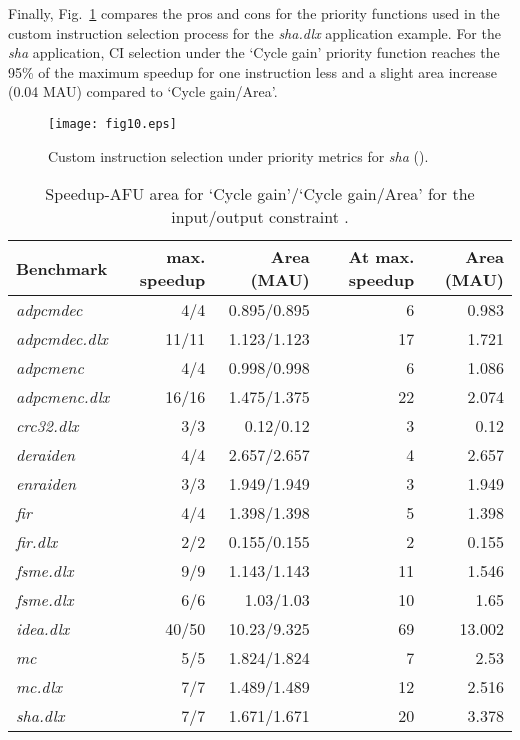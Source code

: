 \documentclass{comjnl}
\begin{document}
Finally, Fig.~\ref{Fig:10} compares the pros and cons for the priority functions 
used in the custom instruction selection process for the {\it sha.dlx} application example. For the {\it sha} application, CI selection under the `Cycle gain' priority function reaches the 95\% of the maximum speedup for one instruction less and a slight area increase (0.04 MAU) compared to `Cycle gain/Area'.

\begin{figure}[tb]
  \centering
  \texttt{[image: fig10.eps]}
  \caption{Custom instruction selection under priority metrics for {\it sha}
  ().}
  \label{Fig:10}
  \vspace{-0.175cm}
\end{figure}

\begin{table}
  \renewcommand{\arraystretch}{1.0}
  \caption{Speedup-AFU area for `Cycle gain'/`Cycle gain/Area' 
  for the input/output constraint .} 
  \centering
  {\footnotesize
  \begin{tabular}{|l|r|r|r|r|}
    \hline
    \multicolumn{1}{|m{1.2cm}|}{\centering Benchmark}
    &\multicolumn{1}{m{1.0cm}|}{\centering 0.95 max. speedup}
    &\multicolumn{1}{m{1.2cm}|}{\centering Area (MAU)}
    &\multicolumn{1}{m{1.0cm}|}{\centering At max. speedup}
    &\multicolumn{1}{m{1.2cm}|}{\centering Area (MAU)}\\
    \hline
{\it adpcmdec} & 4/4 & 0.895/0.895 & 6 & 0.983 \\ 
    \hline
{\it adpcmdec.dlx} & 11/11 & 1.123/1.123 & 17 & 1.721 \\ 
    \hline
{\it adpcmenc} & 4/4 & 0.998/0.998 & 6 & 1.086 \\
    \hline
{\it adpcmenc.dlx} & 16/16 & 1.475/1.375 & 22 & 2.074 \\
    \hline
{\it crc32.dlx} & 3/3 & 0.12/0.12 & 3 & 0.12 \\
    \hline
{\it deraiden} & 4/4 & 2.657/2.657 & 4 & 2.657 \\
    \hline
{\it enraiden} & 3/3 & 1.949/1.949 & 3 & 1.949 \\
    \hline
{\it fir} & 4/4 & 1.398/1.398 & 5 & 1.398 \\
    \hline
{\it fir.dlx} & 2/2 & 0.155/0.155 & 2 & 0.155 \\
    \hline
{\it fsme.dlx} & 9/9 & 1.143/1.143 & 11 & 1.546 \\
    \hline
{\it fsme.dlx} & 6/6 & 1.03/1.03 & 10 & 1.65 \\
    \hline
{\it idea.dlx} & 40/50 & 10.23/9.325 & 69 & 13.002 \\
    \hline
{\it mc} & 5/5 & 1.824/1.824 & 7 & 2.53 \\
    \hline
{\it mc.dlx} & 7/7 & 1.489/1.489 & 12 & 2.516 \\
    \hline
{\it sha.dlx} & 7/7 & 1.671/1.671 & 20 & 3.378 \\
    \hline
  \end{tabular}
  }
  \label{Tab:5}
  \vspace{-0.25cm}
\end{table}
\end{document}
